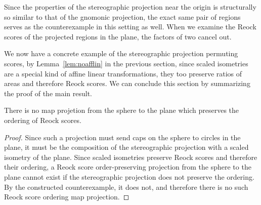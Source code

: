 Since the properties of the stereographic projection near the origin is structurally so similar to that of the gnomonic projection, the exact same pair of regions serves as the counterexample in this setting as well.  When we examine the Reock scores of the projected regions in the plane, the factors of two cancel out.



We now have a concrete example of the stereographic projection permuting scores, by Lemma~\ref{lem:noafflin} in the previous section, since scaled isometries are a special kind of affine linear transformations, they too preserve ratios of areas and therefore Reock scores.  We can conclude this section by summarizing the proof of the main result.

\begin{theorem}
There is no map projetion from the sphere to the plane which preserves the ordering of Reock scores.
\end{theorem}
\begin{proof}
Since such a projection must send caps on the sphere to circles in the plane, it must be the composition of the stereographic projection with a scaled isometry of the plane.  Since scaled isometries preserve Reock scores and therefore their ordering, a Reock score order-preserving projection from the sphere to the plane cannot exist if the stereographic projection does not preserve the ordering.  By the constructed counterexample, it does not, and therefore there is no such Reock score ordering map projection.
\end{proof}
